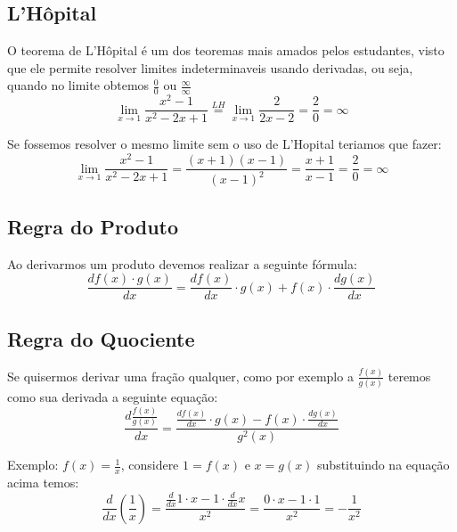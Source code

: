 \documentclass{article}
\begin{document}
    \subsection{L'Hôpital}
    O teorema de L'Hôpital é um dos teoremas mais amados pelos
    estudantes, visto que ele permite resolver limites
    indeterminaveis usando derivadas, ou seja, quando no limite
    obtemos $\frac{0}{0}$ ou $\frac{\infty}{\infty}$
    \begin{equation*}
        \lim_{x\to 1} \frac{x^2 - 1}{x^2 - 2x + 1} \stackrel{LH}{=}
        \lim_{x\to 1} \frac{2}{2x - 2} = \frac{2}{0} = \infty
    \end{equation*}

    Se fossemos resolver o mesmo limite sem o uso de L'Hopital
    teriamos que fazer:
    \begin{equation*}
        \lim_{x\to 1} \frac{x^2 - 1}{x^2 - 2x + 1} =
        \frac{(x + 1)(x - 1)}{(x - 1)^2} = \frac{x + 1}{x - 1}
        = \frac{2}{0} = \infty
    \end{equation*}

    \subsection{Regra do Produto}
    Ao derivarmos um produto devemos realizar a seguinte fórmula:
    \begin{equation*}
        \frac{df(x)\cdot g(x)}{dx} = \frac{df(x)}{dx}\cdot g(x) +
        f(x) \cdot\frac{dg(x)}{dx}
    \end{equation*}

    \subsection{Regra do Quociente}
    Se quisermos derivar uma fração qualquer, como por exemplo a
    $\frac{f(x)}{g(x)}$ teremos como sua derivada a seguinte
    equação:
    \begin{equation*}
        \frac{d\frac{f(x)}{g(x)}}{dx} = \frac{\frac{df(x)}{dx}
        \cdot g(x) - f(x)\cdot\frac{dg(x)}{dx}}{g^2(x)}
    \end{equation*}

    Exemplo: $f(x) = \frac{1}{x}$, considere $1 = f(x)$ e $x = g(x)$
    substituindo na equação acima temos:
    \begin{equation*}
        \frac{d}{dx}(\frac{1}{x}) = \frac{\frac{d}{dx}1 \cdot x - 1
        \cdot \frac{d}{dx}x}{x^2} = \frac{0 \cdot x - 1 \cdot
        1}{x^2} = -\frac{1}{x^2} 
    \end{equation*}
\end{document}
